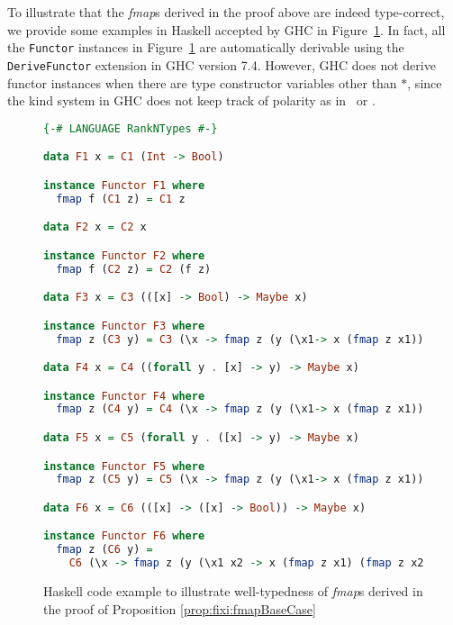 To illustrate that the \textit{fmap}s derived in the proof above are indeed
type-correct, we provide some examples in Haskell accepted by GHC in
Figure~\ref{fig:deriveFunctor}. In fact, all the \texttt{\small Functor}
instances in Figure~\ref{fig:deriveFunctor} are automatically derivable
using the \texttt{\small DeriveFunctor} extension in GHC version 7.4.
However, GHC does not derive functor instances when there are
type constructor variables other than $*$, since the kind system in GHC
does not keep track of polarity as in \Fixw\ or \Fixi.
\begin{figure}
\begin{singlespace}
\begin{lstlisting}[basicstyle={\ttfamily\small},language=Haskell,mathescape]
{-# LANGUAGE RankNTypes #-}

data F1 x = C1 (Int -> Bool)

instance Functor F1 where
  fmap f (C1 z) = C1 z

data F2 x = C2 x

instance Functor F2 where
  fmap f (C2 z) = C2 (f z)

data F3 x = C3 (([x] -> Bool) -> Maybe x)

instance Functor F3 where
  fmap z (C3 y) = C3 (\x -> fmap z (y (\x1-> x (fmap z x1))))

data F4 x = C4 ((forall y . [x] -> y) -> Maybe x)

instance Functor F4 where
  fmap z (C4 y) = C4 (\x -> fmap z (y (\x1-> x (fmap z x1))))

data F5 x = C5 (forall y . ([x] -> y) -> Maybe x)

instance Functor F5 where
  fmap z (C5 y) = C5 (\x -> fmap z (y (\x1-> x (fmap z x1))))

data F6 x = C6 (([x] -> ([x] -> Bool)) -> Maybe x)

instance Functor F6 where
  fmap z (C6 y) =
    C6 (\x -> fmap z (y (\x1 x2 -> x (fmap z x1) (fmap z x2))))
\end{lstlisting}
\end{singlespace}
\caption{Haskell code example to illustrate well-typedness of \textit{fmap}s
        derived in the proof of Proposition \ref{prop:fixi:fmapBaseCase}}
\label{fig:deriveFunctor}
\end{figure}

